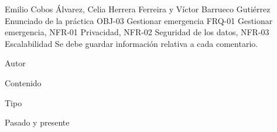 {Emilio Cobos Álvarez, Celia Herrera Ferreira y Víctor Barrueco Gutiérrez}
{Enunciado de la práctica}
{OBJ-03 Gestionar emergencia}
{FRQ-01 Gestionar emergencia, NFR-01 Privacidad, NFR-02 Seguridad de los datos, NFR-03 Escalabilidad}
{Se debe guardar información relativa a cada comentario.}
{
\item{Autor}
\item{Contenido}
\item{Tipo}
}
{Pasado y presente}

